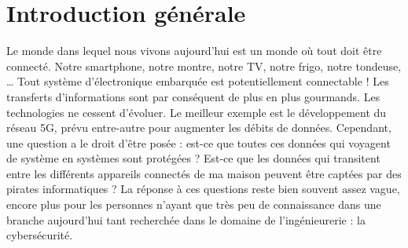 \documentclass[oneside]{book}
\begin{document}
\newpage


{} %

\newpage


\tableofcontents
\newpage


\listoffigures
\newpage


\listoftables
\newpage
\strut
\thispagestyle{empty}
\newpage
{}



\chapter{Introduction générale}

Le monde dans lequel nous vivons aujourd’hui est un monde où tout doit être connecté. Notre smartphone, notre montre, notre TV, notre frigo, notre tondeuse, … Tout système d’électronique embarquée est potentiellement connectable ! Les transferts d’informations sont par conséquent de plus en plus gourmands. Les technologies ne cessent d’évoluer. Le meilleur exemple est le développement du réseau 5G, prévu entre-autre pour augmenter les débits de données. Cependant, une question a le droit d’être posée : est-ce que toutes ces données qui voyagent de système en systèmes sont protégées ? Est-ce que les données qui transitent entre les différents appareils connectés de ma maison peuvent être captées par des pirates informatiques ? La réponse à ces questions reste bien souvent assez vague, encore plus pour les personnes n'ayant que très peu de connaissance dans une branche aujourd'hui tant recherchée dans le domaine de l'ingénieurerie : la cybersécurité.
\end{document}
